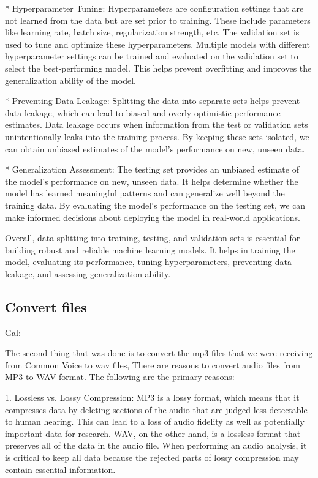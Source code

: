\documentclass[a4paper]{article}
\begin{document}
* Hyperparameter Tuning: Hyperparameters are configuration settings that are not learned from the data but are set prior to training. These include parameters like learning rate, batch size, regularization strength, etc. The validation set is used to tune and optimize these hyperparameters. Multiple models with different hyperparameter settings can be trained and evaluated on the validation set to select the best-performing model. This helps prevent overfitting and improves the generalization ability of the model.

* Preventing Data Leakage: Splitting the data into separate sets helps prevent data leakage, which can lead to biased and overly optimistic performance estimates. Data leakage occurs when information from the test or validation sets unintentionally leaks into the training process. By keeping these sets isolated, we can obtain unbiased estimates of the model's performance on new, unseen data.

* Generalization Assessment: The testing set provides an unbiased estimate of the model's performance on new, unseen data. It helps determine whether the model has learned meaningful patterns and can generalize well beyond the training data. By evaluating the model's performance on the testing set, we can make informed decisions about deploying the model in real-world applications.

Overall, data splitting into training, testing, and validation sets is essential for building robust and reliable machine learning models. It helps in training the model, evaluating its performance, tuning hyperparameters, preventing data leakage, and assessing generalization ability.

\subsection{Convert files}

Gal:

The second thing that was done is to convert the mp3 files that we were receiving from Common Voice to wav files, There are reasons to convert audio files from MP3 to WAV format. The following are the primary reasons:

1. Lossless vs. Lossy Compression: MP3 is a lossy format, which means that it compresses data by deleting sections of the audio that are judged less detectable to human hearing. This can lead to a loss of audio fidelity as well as potentially important data for research. WAV, on the other hand, is a lossless format that preserves all of the data in the audio file. When performing an audio analysis, it is critical to keep all data because the rejected parts of lossy compression may contain essential information.
\end{document}
